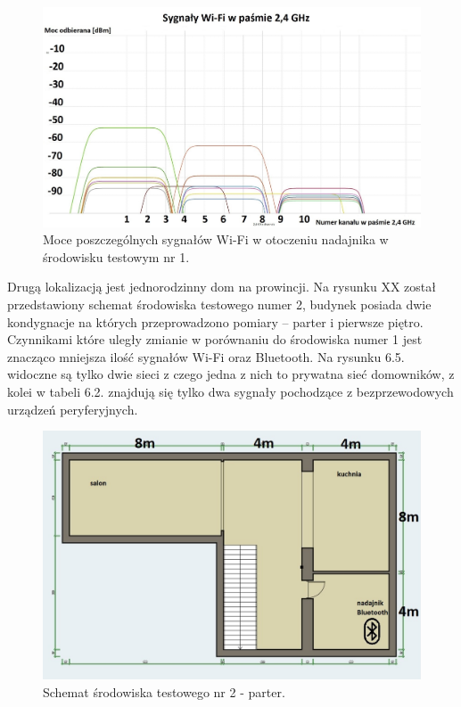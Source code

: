 \documentclass[12pt, twoside, openany]{mwrep}
\begin{document}
\begin{figure}[H]
\centering
\includegraphics[scale=0.35]{2,4Ghz}
\caption{Moce poszczególnych sygnałów Wi-Fi w otoczeniu nadajnika w środowisku testowym nr 1.}
\end{figure}
\par
Drugą lokalizacją jest jednorodzinny dom na prowincji. Na rysunku XX został przedstawiony schemat środowiska testowego numer 2, budynek posiada dwie kondygnacje na których przeprowadzono pomiary – parter i pierwsze piętro. Czynnikami które uległy zmianie w porównaniu do środowiska numer 1 jest znacząco mniejsza ilość sygnałów Wi-Fi oraz Bluetooth. Na rysunku 6.5. widoczne są tylko dwie sieci z czego jedna z nich to prywatna sieć domowników, z kolei w tabeli 6.2. znajdują się tylko dwa sygnały pochodzące z bezprzewodowych urządzeń peryferyjnych.
\par
\begin{figure}[H]
\centering
\includegraphics[scale=0.4]{dom1pietro}
\caption{Schemat środowiska testowego nr 2 - parter.}
\end{figure}
\end{document}

